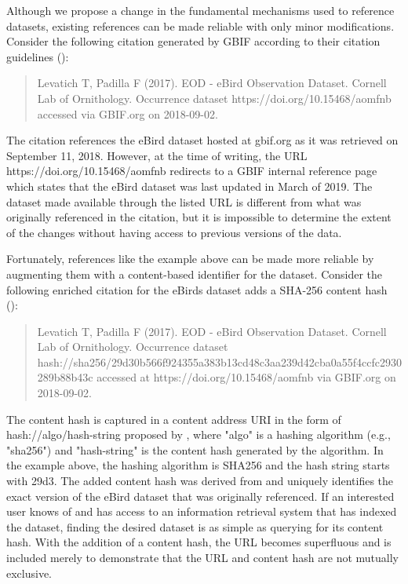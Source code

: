 \documentclass[12pt,letterpaper]{article}
\begin{document}
Although we propose a change in the fundamental mechanisms used to reference datasets, existing references can be made reliable with only minor modifications. Consider the following citation generated by GBIF according to their citation guidelines (\cite{gbif_2019}):

\begin{quote}
    Levatich T, Padilla F (2017). EOD - eBird Observation Dataset. Cornell Lab of Ornithology. Occurrence dataset https://doi.org/10.15468/aomfnb accessed via GBIF.org on 2018-09-02.
\end{quote}

The citation references the eBird dataset hosted at gbif.org as it was retrieved on September 11, 2018. However, at the time of writing, the URL https://doi.org/10.15468/aomfnb redirects to a GBIF internal reference page which states that the eBird dataset was last updated in March of 2019. The dataset made available through the listed URL is different from what was originally referenced in the citation, but it is impossible to determine the extent of the changes without having access to previous versions of the data.

Fortunately, references like the example above can be made more reliable by augmenting them with a content-based identifier for the dataset. Consider the following enriched citation for the eBirds dataset adds a SHA-256 content hash (\cite{SHA2_2001}):

\begin{quote}
    Levatich T, Padilla F (2017). EOD - eBird Observation Dataset. Cornell Lab of Ornithology. Occurrence dataset hash://sha256/29d30b566f924355a383b13cd48c3aa239d42cba0a55f4ccfc2930289b88b43c accessed at https://doi.org/10.15468/aomfnb via GBIF.org on 2018-09-02.
\end{quote}

The content hash is captured in a content address URI in the form of hash://algo/hash-string proposed by \cite{Trask_2015}, where "algo" is a hashing algorithm (e.g., "sha256") and "hash-string" is the content hash generated by the algorithm. In the example above, the hashing algorithm is SHA256 and the hash string starts with 29d3. The added content hash was derived from and uniquely identifies the exact version of the eBird dataset that was originally referenced. If an interested user knows of and has access to an information retrieval system that has indexed the dataset, finding the desired dataset is as simple as querying for its content hash. With the addition of a content hash, the URL becomes superfluous and is included merely to demonstrate that the URL and content hash are not mutually exclusive.
\end{document}
